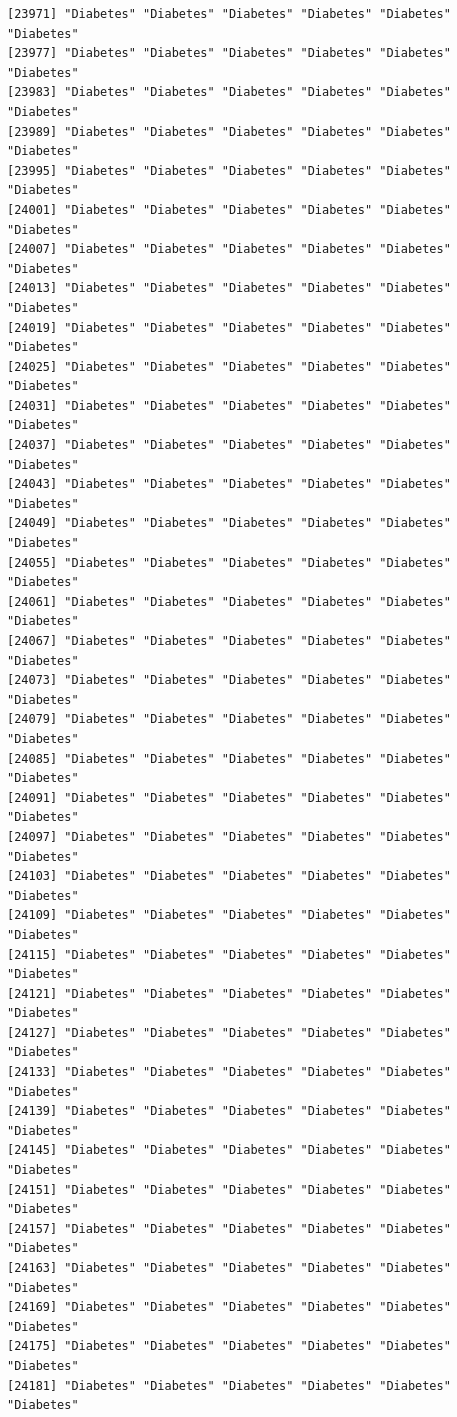 \documentclass[
  letterpaper,
  DIV=11,
  numbers=noendperiod]{scrartcl}
\begin{document}
\begin{verbatim}
[23971] "Diabetes" "Diabetes" "Diabetes" "Diabetes" "Diabetes" "Diabetes"
[23977] "Diabetes" "Diabetes" "Diabetes" "Diabetes" "Diabetes" "Diabetes"
[23983] "Diabetes" "Diabetes" "Diabetes" "Diabetes" "Diabetes" "Diabetes"
[23989] "Diabetes" "Diabetes" "Diabetes" "Diabetes" "Diabetes" "Diabetes"
[23995] "Diabetes" "Diabetes" "Diabetes" "Diabetes" "Diabetes" "Diabetes"
[24001] "Diabetes" "Diabetes" "Diabetes" "Diabetes" "Diabetes" "Diabetes"
[24007] "Diabetes" "Diabetes" "Diabetes" "Diabetes" "Diabetes" "Diabetes"
[24013] "Diabetes" "Diabetes" "Diabetes" "Diabetes" "Diabetes" "Diabetes"
[24019] "Diabetes" "Diabetes" "Diabetes" "Diabetes" "Diabetes" "Diabetes"
[24025] "Diabetes" "Diabetes" "Diabetes" "Diabetes" "Diabetes" "Diabetes"
[24031] "Diabetes" "Diabetes" "Diabetes" "Diabetes" "Diabetes" "Diabetes"
[24037] "Diabetes" "Diabetes" "Diabetes" "Diabetes" "Diabetes" "Diabetes"
[24043] "Diabetes" "Diabetes" "Diabetes" "Diabetes" "Diabetes" "Diabetes"
[24049] "Diabetes" "Diabetes" "Diabetes" "Diabetes" "Diabetes" "Diabetes"
[24055] "Diabetes" "Diabetes" "Diabetes" "Diabetes" "Diabetes" "Diabetes"
[24061] "Diabetes" "Diabetes" "Diabetes" "Diabetes" "Diabetes" "Diabetes"
[24067] "Diabetes" "Diabetes" "Diabetes" "Diabetes" "Diabetes" "Diabetes"
[24073] "Diabetes" "Diabetes" "Diabetes" "Diabetes" "Diabetes" "Diabetes"
[24079] "Diabetes" "Diabetes" "Diabetes" "Diabetes" "Diabetes" "Diabetes"
[24085] "Diabetes" "Diabetes" "Diabetes" "Diabetes" "Diabetes" "Diabetes"
[24091] "Diabetes" "Diabetes" "Diabetes" "Diabetes" "Diabetes" "Diabetes"
[24097] "Diabetes" "Diabetes" "Diabetes" "Diabetes" "Diabetes" "Diabetes"
[24103] "Diabetes" "Diabetes" "Diabetes" "Diabetes" "Diabetes" "Diabetes"
[24109] "Diabetes" "Diabetes" "Diabetes" "Diabetes" "Diabetes" "Diabetes"
[24115] "Diabetes" "Diabetes" "Diabetes" "Diabetes" "Diabetes" "Diabetes"
[24121] "Diabetes" "Diabetes" "Diabetes" "Diabetes" "Diabetes" "Diabetes"
[24127] "Diabetes" "Diabetes" "Diabetes" "Diabetes" "Diabetes" "Diabetes"
[24133] "Diabetes" "Diabetes" "Diabetes" "Diabetes" "Diabetes" "Diabetes"
[24139] "Diabetes" "Diabetes" "Diabetes" "Diabetes" "Diabetes" "Diabetes"
[24145] "Diabetes" "Diabetes" "Diabetes" "Diabetes" "Diabetes" "Diabetes"
[24151] "Diabetes" "Diabetes" "Diabetes" "Diabetes" "Diabetes" "Diabetes"
[24157] "Diabetes" "Diabetes" "Diabetes" "Diabetes" "Diabetes" "Diabetes"
[24163] "Diabetes" "Diabetes" "Diabetes" "Diabetes" "Diabetes" "Diabetes"
[24169] "Diabetes" "Diabetes" "Diabetes" "Diabetes" "Diabetes" "Diabetes"
[24175] "Diabetes" "Diabetes" "Diabetes" "Diabetes" "Diabetes" "Diabetes"
[24181] "Diabetes" "Diabetes" "Diabetes" "Diabetes" "Diabetes" "Diabetes"

\end{verbatim}
\end{document}
